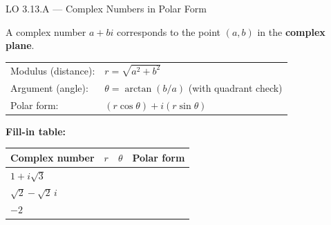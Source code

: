 \documentclass[10pt]{article}
\begin{document}
\vspace{0.08in}

\begin{notesbox}{LO 3.13.A --- Complex Numbers in Polar Form}

A complex number $a+bi$ corresponds to the point $(a,b)$ in the \textbf{complex plane}.

\vspace{4pt}
\begin{tabular}{ll}
Modulus (distance): & $r = \sqrt{a^2+b^2}$ \\[4pt]
Argument (angle):   & $\theta = \arctan(b/a)$ (with quadrant check) \\[4pt]
Polar form:         & $(r\cos\theta) + i(r\sin\theta)$ \\
\end{tabular}

\vspace{8pt}
\textbf{Fill-in table:}

\vspace{4pt}
\renewcommand{\arraystretch}{1.8}
\begin{tabular}{|l|c|c|c|}
\hline
\textbf{Complex number} & \textbf{$r$} & \textbf{$\theta$} & \textbf{Polar form} \\
\hline
$1 + i\sqrt{3}$ & \underline{\hspace{1.5cm}} & \underline{\hspace{1.5cm}} & \underline{\hspace{3.5cm}} \\
\hline
$\sqrt{2} - \sqrt{2}\,i$ & \underline{\hspace{1.5cm}} & \underline{\hspace{1.5cm}} & \underline{\hspace{3.5cm}} \\
\hline
$-2$ & \underline{\hspace{1.5cm}} & \underline{\hspace{1.5cm}} & \underline{\hspace{3.5cm}} \\
\hline
\end{tabular}

\end{notesbox}

\vspace{0.08in}
\end{document}
